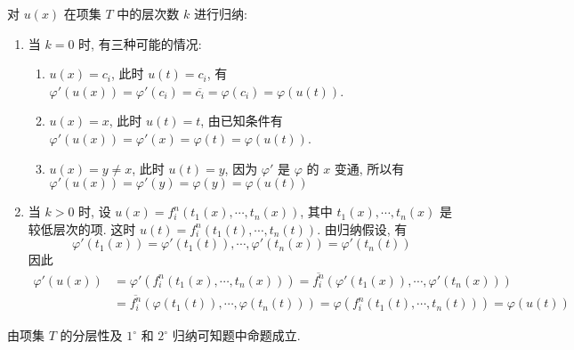 \documentclass[boxes]{homework}
\begin{document}
\begin{solution}
    对 $u(x)$ 在项集 $T$ 中的层次数 $k$ 进行归纳:
    \begin{enumerate}[label = $\arabic*^\circ$, parsep = 0pt, itemsep = 0pt, topsep = .25em]
        \item 当 $k=0$ 时, 有三种可能的情况:
              \begin{enumerate}[label = \arabic*), parsep = 0pt, itemsep = 0pt, topsep = .25em]
                  \item $u(x) = c_i$, 此时 $u(t) = c_i$, 有 $\varphi'(u(x)) = \varphi'(c_i) = \overline{c_i} = \varphi(c_i) = \varphi(u(t))$.
                  \item $u(x) = x$, 此时 $u(t) = t$, 由已知条件有 $\varphi'(u(x)) = \varphi'(x) = \varphi(t) = \varphi(u(t))$.
                  \item $u(x) = y \neq x$, 此时 $u(t) = y$, 因为 $\varphi'$ 是 $\varphi$ 的 $x$ 变通, 所以有 $\varphi'(u(x)) = \varphi'(y) = \varphi(y) = \varphi(u(t))$
              \end{enumerate}
        \item 当 $k > 0$ 时, 设 $u(x) = f_i^n(t_1(x), \cdots, t_n(x))$, 其中 $t_1(x), \cdots, t_n(x)$ 是较低层次的项. 这时 $u(t) = f_i^n(t_1(t), \cdots, t_n(t))$. 由归纳假设, 有
              $$
                  \varphi'(t_1(x)) = \varphi'(t_1(t)), \cdots, \varphi'(t_n(x)) = \varphi'(t_n(t))
              $$
              因此
              \begin{align*}
                  \varphi'(u(x)) & = \varphi'(f_i^n(t_1(x), \cdots, t_n(x))) = \overline{f_i^n}(\varphi'(t_1(x)), \cdots, \varphi'(t_n(x)))              \\
                                 & = \overline{f_i^n}(\varphi(t_1(t)), \cdots, \varphi(t_n(t))) = \varphi(f_i^n(t_1(t), \cdots, t_n(t))) = \varphi(u(t))
              \end{align*}
    \end{enumerate}
    由项集 $T$ 的分层性及 $1^\circ$ 和 $2^\circ$ 归纳可知题中命题成立.
\end{solution}
\end{document}
